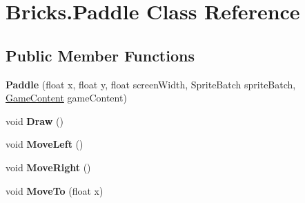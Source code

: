 \hypertarget{class_bricks_1_1_paddle}{}\section{Bricks.\+Paddle Class Reference}
\label{class_bricks_1_1_paddle}
\subsection*{Public Member Functions}
\begin{DoxyCompactItemize}
\item 
\mbox{\label{class_bricks_1_1_paddle_a332e29676b68aba73495ae8128a10bb9}} 
{\bfseries Paddle} (float x, float y, float screen\+Width, Sprite\+Batch sprite\+Batch, \mbox{\hyperlink{class_bricks_1_1_game_content}{Game\+Content}} game\+Content)
\item 
\mbox{\label{class_bricks_1_1_paddle_a92c1bf437c39081edb9b11b3d0f2622d}} 
void {\bfseries Draw} ()
\item 
\mbox{\label{class_bricks_1_1_paddle_ac3f5afd544f6b0a4ee1630c919d4b489}} 
void {\bfseries Move\+Left} ()
\item 
\mbox{\label{class_bricks_1_1_paddle_a154a68fb1665960eddd0286b6a47126a}} 
void {\bfseries Move\+Right} ()
\item 
\mbox{\label{class_bricks_1_1_paddle_a490549dafa4e183078161c7e62c92e18}} 
void {\bfseries Move\+To} (float x)
\end{DoxyCompactItemize}
